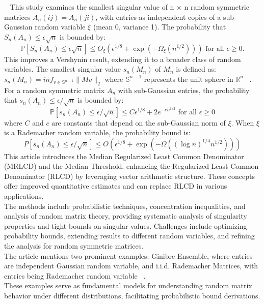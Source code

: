 ~\cite{jain2020smallest} 
This study examines the smallest singular value of n $\times$ n random symmetric matrices $A_n(ij) = A_n(ji)$, with entries as independent copies of a sub-Gaussian random variable $\xi$ (mean 0, variance 1).
The probability that $S_n(A_n) \leq \epsilon\sqrt{n}$ is bounded by:
\begin{equation*}
    \mathbb{P}[S_n(A_n) \leq \epsilon \sqrt{n}] \leq O_\xi(\epsilon^{1/8} + \exp(-\Omega_\xi(n^{1/2}))) \text{ for all } \epsilon \geq 0.
\end{equation*}
This improves a Vershynin result, extending it to a broader class of random variables.
The smallest singular value $s_n(M_n)$ of $M_n$ is defined as: $s_n(M_n) = inf_{v \in \mathbb{S}^{n-1}} \|Mv\|_2$
where $\mathbb{S}^{n-1}$ represents the unit sphere in $\mathbb{R}^n$ ~\cite{rudelson2008littlewood}.
For a random symmetric matrix $A_n$ with sub-Gaussian entries, the probability that $s_n(A_n) \leq \epsilon/\sqrt{n}$ is bounded by:
\begin{equation*}
    \mathbb{P}[s_n(A_n)\leq \epsilon/\sqrt{n}]\leq C \epsilon^{1/8}+2e^{-c n^{1/2}} \text{ for all } \epsilon \geq 0
\end{equation*}
where $C$ and $c$ are constants that depend on the sub-Gaussian norm of $\xi$.
When $\xi$ is a Rademacher random variable, the probability bound is:
\begin{equation*}
    P[s_n(A_n) \leq \epsilon / \sqrt{n}] \leq O(\epsilon^{1/8}+ \exp(-\Omega((\log{n})^{1/4}n^{1/2})))
\end{equation*}
This article introduces the Median Regularized Least Common Denominator (MRLCD) and the Median Threshold, enhancing the Regularized Least Common Denominator (RLCD) by leveraging vector arithmetic structure.
These concepts offer improved quantitative estimates and can replace RLCD in various applications.\\
The methods include probabilistic techniques, concentration inequalities, and analysis of random matrix theory, providing systematic analysis of singularity properties and tight bounds on singular values.
Challenges include optimizing probability bounds, extending results to different random variables, and refining the analysis for random symmetric matrices.\\
The article mentions two prominent examples: Ginibre Ensemble, where entries are independent Gaussian random variable, and i.i.d. Rademacher Matrices, with entries being Rademacher random variable ~\cite{bourgain2010singularity}.\\
These examples serve as fundamental models for understanding random matrix behavior under different distributions, facilitating probabilistic bound derivations.
